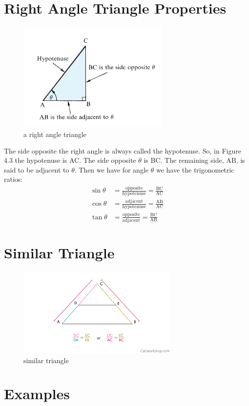 \section{Right Angle Triangle Properties}
\begin{figure}[htp]
	\centering
	\includegraphics[width=75mm]{Assets/right-angle-triangle}
	\caption{a right angle triangle}
	\label{fig:right-angle}
\end{figure}
\noindent The side opposite the right angle is always called the hypotenuse. So,
in Figure 4.3 the hypotenuse is AC. The side opposite $\theta$ is BC. The
remaining side, AB, is said to be adjacent to $\theta$. Then we have for angle $\theta$ we have the trigonometric ratios:
\begin{equation} \label{eq1}
	\begin{split}
		\sin\theta & = \frac{\text{opposite}}{\text{hypotenuse}} = \frac{\text{BC}}{\text{AC}} \\
		\cos\theta & = \frac{\text{adjacent}}{\text{hypotenuse}} = \frac{\text{AB}}{\text{AC}} \\
		\tan\theta & = \frac{\text{opposite}}{\text{adjacent}} = \frac{\text{BC}}{\text{AB}}
	\end{split}
\end{equation}
\section{Similar Triangle}
\begin{figure}[htp]
	\centering
	\includegraphics{Assets/similar-triangle}
	\caption{similar triangle}
	\label{fig:radian}
\end{figure}
\section{Examples}